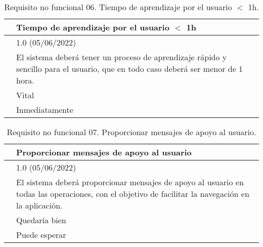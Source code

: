 \begin{table}[H]
\begin{center}
\begin{tabular}{|p{3cm}|p{10cm}|} \hline
\centering {\bf NFR-06} & Tiempo de aprendizaje por el usuario $<$ 1h  \\ \hline\hline
\centering {\bf Versión} & 1.0 (05/06/2022) \\ \hline
\centering {\bf Descripción} & El sistema deberá tener un proceso de aprendizaje rápido y sencillo para el usuario, que en todo caso deberá ser menor de 1 hora. \\ \hline
\centering {\bf Importancia} & Vital \\ \hline
\centering {\bf Urgencia} & Inmediatamente \\ \hline
\end{tabular}
\caption{Requisito no funcional 06. Tiempo de aprendizaje por el usuario $<$ 1h.}
\label{enlaceNFR6}
\end{center}
\end{table}

\begin{table}[H]
\begin{center}
\begin{tabular}{|p{3cm}|p{10cm}|} \hline
\centering {\bf NFR-07} & Proporcionar mensajes de apoyo al usuario  \\ \hline\hline
\centering {\bf Versión} & 1.0 (05/06/2022) \\ \hline
\centering {\bf Descripción} & El sistema deberá proporcionar mensajes de apoyo al usuario en todas las operaciones, con el objetivo de facilitar la navegación en la aplicación. \\ \hline
\centering {\bf Importancia} & Quedaría bien \\ \hline
\centering {\bf Urgencia} & Puede esperar \\ \hline
\end{tabular}
\caption{Requisito no funcional 07. Proporcionar mensajes de apoyo al usuario.}
\label{enlaceNFR7}
\end{center}
\end{table}

